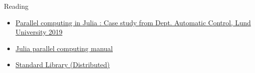 \documentclass[10pt]{beamer}
\begin{document}
\begin{frame}{Reading}{}
	\begin{itemize}
		\item \href{https://lup.lub.lu.se/search/publication/873af4d5-6229-4ad2-b907-c0ae0f667822}{Parallel computing in Julia : Case study from Dept. Automatic Control, Lund University 2019}
		\item \href{https://docs.julialang.org/en/v1/manual/parallel-computing/}{Julia parallel computing manual}
		\item \href{https://docs.julialang.org/en/v1/stdlib/Distributed/}{Standard Library (Distributed)}
\end{itemize}
\end{frame}
\end{document}
